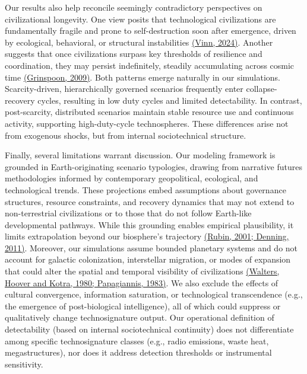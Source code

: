 Our results also help reconcile seemingly contradictory perspectives on civilizational longevity. One view posits that technological civilizations are fundamentally fragile and prone to self-destruction soon after emergence, driven by ecological, behavioral, or structural instabilities \href{https://paperpile.com/c/hQuIW4/5aSj}{(Vinn, 2024)}. Another suggests that once civilizations surpass key thresholds of resilience and coordination, they may persist indefinitely, steadily accumulating across cosmic time \href{https://paperpile.com/c/hQuIW4/dG8s}{(Grinspoon, 2009)}. Both patterns emerge naturally in our simulations. Scarcity-driven, hierarchically governed scenarios frequently enter collapse-recovery cycles, resulting in low duty cycles and limited detectability. In contrast, post-scarcity, distributed scenarios maintain stable resource use and continuous activity, supporting high-duty-cycle technospheres. These differences arise not from exogenous shocks, but from internal sociotechnical structure.

Finally, several limitations warrant discussion. Our modeling framework is grounded in Earth-originating scenario typologies, drawing from narrative futures methodologies informed by contemporary geopolitical, ecological, and technological trends. These projections embed assumptions about governance structures, resource constraints, and recovery dynamics that may not extend to non-terrestrial civilizations or to those that do not follow Earth-like developmental pathways. While this grounding enables empirical plausibility, it limits extrapolation beyond our biosphere's trajectory \href{https://paperpile.com/c/hQuIW4/i0of+jkfy}{(Rubin, 2001; Denning, 2011)}. Moreover, our simulations assume bounded planetary systems and do not account for galactic colonization, interstellar migration, or modes of expansion that could alter the spatial and temporal visibility of civilizations \href{https://paperpile.com/c/hQuIW4/BUk6+Cy4U}{(Walters, Hoover and Kotra, 1980; Papagiannis, 1983)}. We also exclude the effects of cultural convergence, information saturation, or technological transcendence (e.g., the emergence of post-biological intelligence), all of which could suppress or qualitatively change technosignature output. Our operational definition of detectability (based on internal sociotechnical continuity) does not differentiate among specific technosignature classes (e.g., radio emissions, waste heat, megastructures), nor does it address detection thresholds or instrumental sensitivity.

